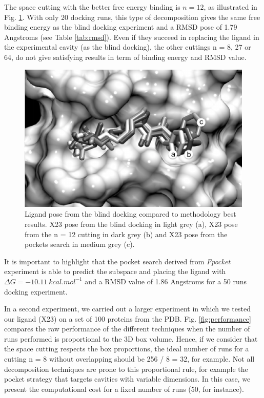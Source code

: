  The space cutting with the better free energy binding is $n = 12$, as illustrated in Fig. \ref{fig:cuts}. With only 20 docking runs, this type of decomposition gives the same free binding energy as the blind docking experiment and a RMSD pose of 1.79 Angstroms (see Table \ref{tab:rmsd}). Even if they succeed in replacing the ligand in the experimental cavity (as the blind docking), the other cuttings n = 8, 27 or 64, do not give satisfying results in term of binding energy and RMSD value.
 
 \begin{figure}[h]
 	\begin{center}
 		\includegraphics[width=1\linewidth]{images/Romain/fig5-bw} 
 		\caption{Ligand pose from the blind docking compared to methodology best results. X23 pose from the blind docking in light grey (a), X23 pose from the n = 12 cutting in dark grey (b) and X23 pose from the pockets search in medium grey (c).}\label{fig:cuts}\vspace{-0.3cm}
 	\end{center}
 \end{figure}
 
 It is important to highlight that the pocket search derived from \textit{Fpocket} experiment is able to predict the subspace and placing the ligand with $\Delta G = -10.11~kcal.mol^{-1}$ and a RMSD value of 1.86 Angstroms for a 50 runs docking experiment. 
 
 In a second experiment, we carried out a larger experiment in which we tested our ligand (X23) on a set of 100 proteins from the PDB. 
 Fig. \ref{fig:performance} compares the raw performance of the different techniques when the number of runs performed is proportional to the 3D box volume. Hence, if we consider that the space cutting respects the box proportions, the ideal number of runs for a cutting n = 8 without overlapping should be 256 / 8 = 32, for example. Not all decomposition techniques are prone to this proportional rule, for example the pocket strategy that targets cavities with variable dimensions. In this case, we present the computational cost for a fixed number of runs (50, for instance).  
 

